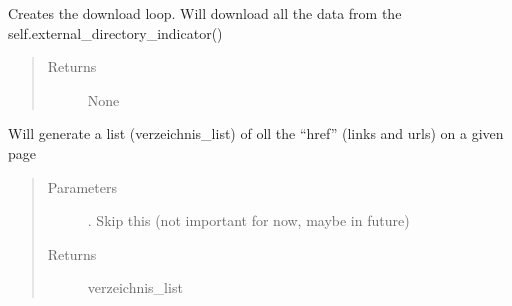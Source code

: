 \documentclass[letterpaper,10pt,english]{sphinxmanual}
\begin{document}
\begin{fulllineitems}
\begin{fulllineitems}
\begin{quote}
\begin{description}
\end{description}\end{quote}

\end{fulllineitems}


\begin{fulllineitems}
\label{\detokenize{DwdDataScrapper:DwdDataScrapper.DataScrapper.download_loop}}
\sphinxAtStartPar
{} Creates the download loop. Will download all the data from the self.external\_directory\_indicator()
\begin{quote}\begin{description}
\item[{Returns}] \leavevmode
\sphinxAtStartPar
None

\end{description}\end{quote}

\end{fulllineitems}


\begin{fulllineitems}
\label{\detokenize{DwdDataScrapper:DwdDataScrapper.DataScrapper.external_directory_indicator}}
\sphinxAtStartPar
{} Will generate a list (verzeichnis\_list) of oll the “href” (links and urls) on a given page
\begin{quote}\begin{description}
\item[{Parameters}] \leavevmode
\sphinxAtStartPar
{} \textendash{} . Skip this (not important for now, maybe in future)

\item[{Returns}] \leavevmode
\sphinxAtStartPar
verzeichnis\_list 


\end{description}
\end{quote}
\end{fulllineitems}
\end{fulllineitems}
\end{document}
